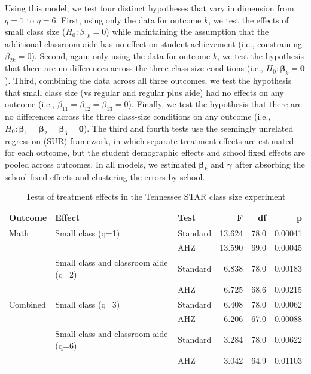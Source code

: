 \documentclass[12pt]{article}\usepackage[]{graphicx}\usepackage[]{color}
\newcommand{\bm}{\mathbf}
\newcommand{\bs}{\boldsymbol}
\begin{document}
Using this model, we test four distinct hypotheses that vary in dimension from $q = 1$ to $q = 6$. 
First, using only the data for outcome $k$, we test the effects of small class size ($H_0: \beta_{1k} = 0$) while maintaining the assumption that the additional classroom aide has no effect on student achievement (i.e., constraining $\beta_{2k} = 0$). 
Second, again only using the data for outcome $k$, we test the hypothesis that there are no differences across the three class-size conditions (i.e., $H_0: \bs\beta_k = \bm{0}$). 
Third, combining the data across all three outcomes, we test the hypothesis that small class size (vs regular and regular plus aide) had no effects on any outcome (i.e., $\beta_{11} = \beta_{12} = \beta_{13} = 0$).
Finally, we test the hypothesis that there are no differences across the three class-size conditions on any outcome (i.e., $H_0: \bs\beta_1 = \bs\beta_2 = \bs\beta_3 = \bm{0}$). 
The third and fourth tests use the seemingly unrelated regression (SUR) framework, in which separate treatment effects are estimated for each outcome, but the student demographic effects and school fixed effects are pooled across outcomes. 
In all models, we estimated $\bs\beta_k$ and $\bs\gamma$ after absorbing the school fixed effects and clustering the errors by school.



\begin{table}[tbh]
\centering
\begin{tabular}{lllrrr}
  \toprule
Outcome & Effect & Test & F & df & p \\ 
  \midrule
Math & Small class (q=1) & Standard & 13.624 & 78.0 & 0.00041 \\ 
   &  & AHZ & 13.590 & 69.0 & 0.00045 \\ 
   & Small class and classroom aide (q=2) & Standard & 6.838 & 78.0 & 0.00183 \\ 
   &  & AHZ & 6.725 & 68.6 & 0.00215 \\ 
   \midrule
Combined & Small class (q=3) & Standard & 6.408 & 78.0 & 0.00062 \\ 
   &  & AHZ & 6.206 & 67.0 & 0.00088 \\ 
   & Small class and classroom aide (q=6) & Standard & 3.284 & 78.0 & 0.00622 \\ 
   &  & AHZ & 3.042 & 64.9 & 0.01103 \\ 
   \bottomrule
\end{tabular}
\caption{Tests of treatment effects in the Tennessee STAR class size experiment} 
\label{tab:STAR}
\end{table}
\end{document}
